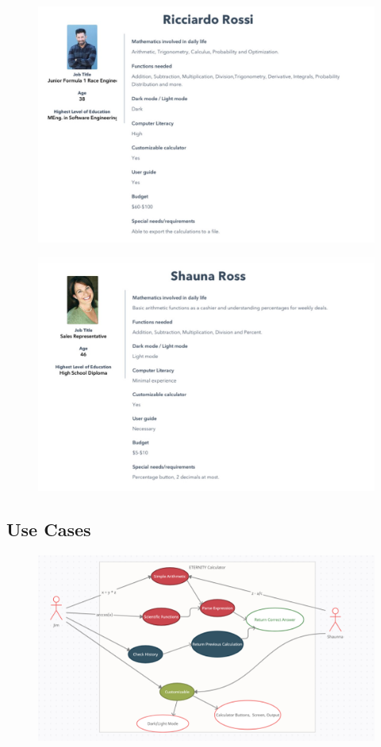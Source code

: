             \begin{figure}[!htb]
                \centering
                \includegraphics{images/Ricciardo-Rossi.JPG}
            \end{figure}
            \begin{figure}[!htb]
                \centering
                \includegraphics{images/Shauna-Ross.JPG}
            \end{figure}
            \FloatBarrier

        \subsection{Use Cases}
            \begin{figure}[!htb]
                \centering
                \includegraphics[scale=0.5]{images/UseCases.PNG}
            \end{figure}
            \FloatBarrier
